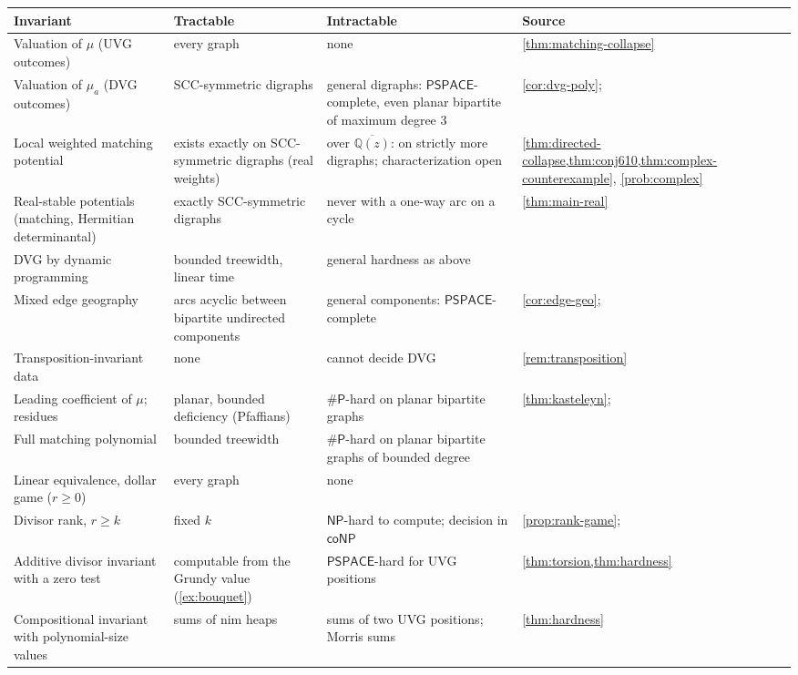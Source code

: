 \documentclass[final]{siamart0516}
\numberwithin{theorem}{section}
\numberwithin{equation}{section}
\theoremstyle{siamnonum}
\theoremstyle{plain}
\newcommand{\QQ}{\mathbb{Q}}
\newcommand{\Qzbar}{\overline{\QQ(z)}}
\newcommand{\cls}[1]{\mathsf{#1}}
\newcommand{\PSPACE}{\cls{PSPACE}}
\newcommand{\NP}{\cls{NP}}
\newcommand{\coNP}{\cls{coNP}}
\newcommand{\sharpP}{\#\cls{P}}
\begin{document}
\begin{center}
\small
\begin{longtable}{@{}L{0.24}L{0.19}L{0.26}L{0.21}@{}}
\toprule
Invariant & Tractable & Intractable & Source\\ \midrule\endhead
Valuation of $\mu$ (UVG outcomes) & every graph & none & \cref{thm:matching-collapse}\\
Valuation of $\mu_a$ (DVG outcomes) & SCC-symmetric digraphs & general digraphs: $\PSPACE$-complete, even planar bipartite of maximum degree $3$ & \cref{cor:dvg-poly}; \cite{LichtensteinSipser}\\
Local weighted matching potential & exists exactly on SCC-symmetric digraphs (real weights) & over $\Qzbar$: on strictly more digraphs; characterization open & \cref{thm:directed-collapse,thm:conj610,thm:complex-counterexample}, \cref{prob:complex}\\
Real-stable potentials (matching, Hermitian determinantal) & exactly SCC-symmetric digraphs & never with a one-way arc on a cycle & \cref{thm:main-real}\\
DVG by dynamic programming & bounded treewidth, linear time & general hardness as above & \cite{Bodlaender}\\
Mixed edge geography & arcs acyclic between bipartite undirected components & general components: $\PSPACE$-complete & \cref{cor:edge-geo}; \cite{FSU}\\
Transposition-invariant data & none & cannot decide DVG & \cref{rem:transposition}\\
Leading coefficient of $\mu$; residues & planar, bounded deficiency (Pfaffians) & $\sharpP$-hard on planar bipartite graphs & \cref{thm:kasteleyn}; \cite{Vadhan}\\
Full matching polynomial & bounded treewidth & $\sharpP$-hard on planar bipartite graphs of bounded degree & \cite{Jerrum,Vadhan}\\
Linear equivalence, dollar game ($r\ge0$) & every graph & none & \cite{BakerShokrieh}\\
Divisor rank, $r\ge k$ & fixed $k$ & $\NP$-hard to compute; decision in $\coNP$ & \cref{prop:rank-game}; \cite{KissToth}\\
Additive divisor invariant with a zero test & computable from the Grundy value (\cref{ex:bouquet}) & $\PSPACE$-hard for UVG positions & \cref{thm:torsion,thm:hardness}\\
Compositional invariant with polynomial-size values & sums of nim heaps & sums of two UVG positions; Morris sums & \cref{thm:hardness}\\
\bottomrule
\end{longtable}
\end{center}
\end{document}
